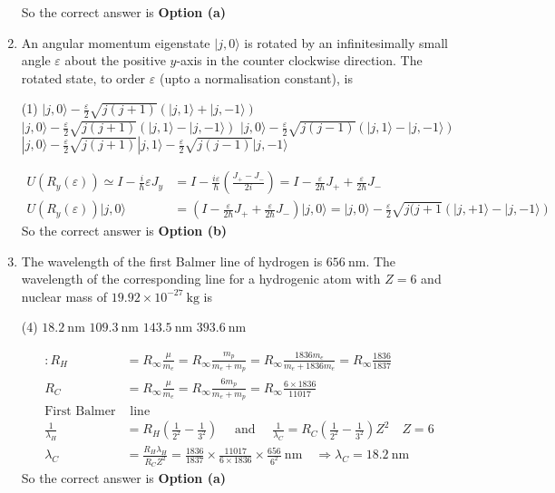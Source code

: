 \begin{enumerate}
\begin{answer}
	So the correct answer is \textbf{Option (a)}
\end{answer}
\item  An angular momentum eigenstate $|j, 0\rangle$ is rotated by an infinitesimally small angle $\varepsilon$ about the positive $y$-axis in the counter clockwise direction. The rotated state, to order $\varepsilon$ (upto a normalisation constant), is
 \begin{tasks}(1)
	\task[\textbf{a.}]$|j, 0\rangle-\frac{\varepsilon}{2} \sqrt{j(j+1)}(|j, 1\rangle+|j,-1\rangle)$
	\task[\textbf{b.}] $|j, 0\rangle-\frac{\varepsilon}{2} \sqrt{j(j+1)}(|j, 1\rangle-|j,-1\rangle)$
	\task[\textbf{c.}]$|j, 0\rangle-\frac{\varepsilon}{2} \sqrt{j(j-1)}(|j, 1\rangle-|j,-1\rangle)$
	\task[\textbf{d.}] $|j, 0\rangle-\frac{\varepsilon}{2} \sqrt{j(j+1)}|j, 1\rangle-\frac{\varepsilon}{2} \sqrt{j(j-1)}|j,-1\rangle$	
\end{tasks}
\begin{answer}
	\begin{align*}
	U\left(R_{y}(\varepsilon)\right) \simeq I-\frac{i}{\hbar} \varepsilon J_{y}&=I-\frac{i \varepsilon}{\hbar}\left(\frac{J_{+}-J_{-}}{2 i}\right)=I-\frac{\varepsilon}{2 \hbar} J_{+}+\frac{\varepsilon}{2 \hbar} J_{-}\\
	U\left(R_{y}(\varepsilon)\right)|j, 0\rangle&=\left(I-\frac{\varepsilon}{2 \hbar} J_{+}+\frac{\varepsilon}{2 \hbar} J_{-}\right)|j, 0\rangle=|j, 0\rangle-\frac{\varepsilon}{2} \sqrt{j(j+1}(|j,+1\rangle-|j,-1\rangle)
	\end{align*}
		So the correct answer is \textbf{Option (b)}
\end{answer}
\item  The wavelength of the first Balmer line of hydrogen is $656 \mathrm{~nm}$. The wavelength of the corresponding line for a hydrogenic atom with $Z=6$ and nuclear mass of $19.92 \times 10^{-27} \mathrm{~kg}$ is
 \begin{tasks}(4)
	\task[\textbf{a.}] $18.2 \mathrm{~nm}$
	\task[\textbf{b.}]$109.3 \mathrm{~nm}$
	\task[\textbf{c.}]$143.5 \mathrm{~nm}$
	\task[\textbf{d.}]  $393.6 \mathrm{~nm}$
\end{tasks}	
\begin{answer}
	\begin{align*}
	: R_{H}&=R_{\infty} \frac{\mu}{m_{e}}=R_{\infty} \frac{m_{p}}{m_{e}+m_{p}}=R_{\infty} \frac{1836 m_{e}}{m_{e}+1836 m_{e}}=R_{\infty} \frac{1836}{1837}\\
	R_{C}&=R_{\infty} \frac{\mu}{m_{e}}=R_{\infty} \frac{6 m_{p}}{m_{e}+m_{p}}=R_{\infty} \frac{6 \times 1836}{11017}\\
	\text{First Balmer}&\text{ line}\\
	\frac{1}{\lambda_{H}}&=R_{H}\left(\frac{1}{2^{2}}-\frac{1}{3^{2}}\right) \quad \text { and } \quad \frac{1}{\lambda_{C}}=R_{C}\left(\frac{1}{2^{2}}-\frac{1}{3^{2}}\right) Z^{2} \quad Z=6 \\
	\lambda_{C}&=\frac{R_{H} \lambda_{H}}{R_{C} Z^{2}}=\frac{1836}{1837} \times \frac{11017}{6 \times 1836} \times \frac{656}{6^{2}} \mathrm{~nm} \quad \Rightarrow \lambda_{C}=18.2 \mathrm{~nm}
	\end{align*}
		So the correct answer is \textbf{Option (a)}
\end{answer}

\end{enumerate}
